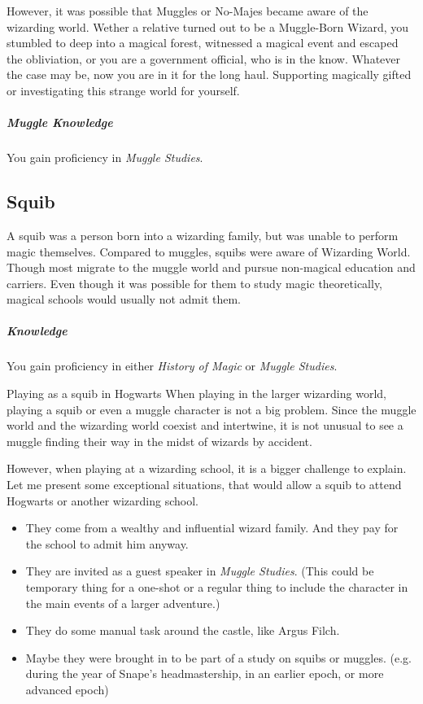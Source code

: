 \documentclass[a4paper,twocolumn,openany,nodeprecatedcode]{dndbook}
\begin{document}
            However, it was possible that Muggles or No-Majes became aware of the wizarding world.
            Wether a relative turned out to be a Muggle-Born Wizard, you stumbled to deep into a magical forest, witnessed a magical event and escaped the obliviation, or you are a government official, who is in the know. Whatever the case may be, now you are in it for the long haul.
            Supporting magically gifted or investigating this strange world for yourself.

            \subparagraph{Muggle Knowledge} You gain proficiency in \textit{Muggle Studies}.

        \subsection{Squib}

            A squib was a person born into a wizarding family, but was unable to perform magic themselves.
            Compared to muggles, squibs were aware of Wizarding World.
            Though most migrate to the muggle world and pursue non-magical education and carriers.
            Even though it was possible for them to study magic theoretically, magical schools would usually not admit them.

            \subparagraph{Knowledge} You gain proficiency in either \textit{History of Magic} or \textit{Muggle Studies}.

        \begin{DndSidebar}{Playing as a squib in Hogwarts}
            When playing in the larger wizarding world,
            playing a squib or even a muggle character is not a big problem.
            Since the muggle world and the wizarding world coexist and intertwine,
            it is not unusual to see a muggle finding their way in the midst of wizards by accident.

            However, when playing at a wizarding school, it is a bigger challenge to explain.
            Let me present some exceptional situations, that would allow a squib to attend Hogwarts or another wizarding school.
            \begin{itemize}
                \item They come from a wealthy and influential wizard family.
                    And they pay for the school to admit him anyway.
                \item They are invited as a guest speaker in \textit{Muggle Studies}.
                    (This could be temporary thing for a one-shot or a regular thing to include the character in the main events of a larger adventure.)
                \item They do some manual task around the castle, like Argus Filch.
                \item Maybe they were brought in to be part of a study on squibs or muggles.
                    (e.g. during the year of Snape's headmastership, in an earlier epoch, or more advanced epoch)
            \end{itemize}
        \end{DndSidebar}
\end{document}
